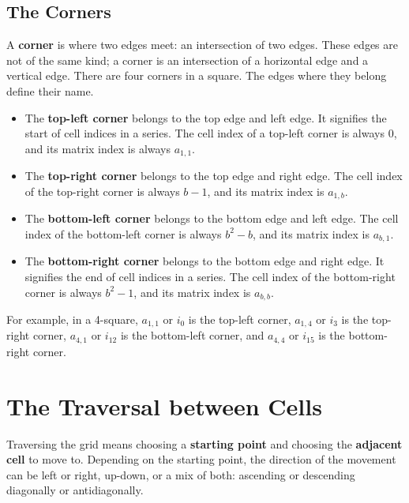 \documentclass[twoside,openany,12pt]{book}
\begin{document}
    \section{The Corners} \label{corners}
    A \textbf{corner} is where two edges meet: an intersection of two edges. These edges are not of the same kind; a corner is an intersection of a horizontal edge and a vertical edge. There are four corners in a square. The edges where they belong define their name.
    \begin{itemize}
        \item The \textbf{top-left corner} belongs to the top edge and left edge. It signifies the start of cell indices in a series. The cell index of a top-left corner is always 0, and its matrix index is always $a_{1,1}$.
        \item The \textbf{top-right corner} belongs to the top edge and right edge. The cell index of the top-right corner is always $b - 1$, and its matrix index is $a_{1,b}$.
        \item The \textbf{bottom-left corner} belongs to the bottom edge and left edge. The cell index of the bottom-left corner is always $b^2 - b$, and its matrix index is $a_{b,1}$.
        \item The \textbf{bottom-right corner} belongs to the bottom edge and right edge. It signifies the end of cell indices in a series. The cell index of the bottom-right corner is always $b^2 - 1$, and its matrix index is $a_{b,b}$.
    \end{itemize}

    For example, in a 4-square, $a_{1,1}$ or $i_0$ is the top-left corner, $a_{1,4}$ or $i_3$ is the top-right corner, $a_{4,1}$ or $i_{12}$ is the bottom-left corner, and $a_{4,4}$ or $i_{15}$ is the bottom-right corner.

    \newpage
    \chapter{The Traversal between Cells} \label{traversal}
    Traversing the grid means choosing a \textbf{starting point} and choosing the \textbf{adjacent cell} to move to. Depending on the starting point, the direction of the movement can be left or right, up-down, or a mix of both: ascending or descending diagonally or antidiagonally.
    
\end{document}
